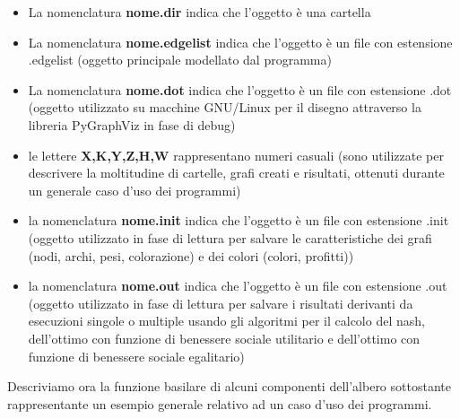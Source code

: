 \begin{itemize}
	\item La nomenclatura \textbf{nome.dir} indica che l'oggetto è una cartella
	\item La nomenclatura \textbf{nome.edgelist} indica che l'oggetto è un file con estensione .edgelist (oggetto principale modellato dal programma)
	\item La nomenclatura \textbf{nome.dot} indica che l'oggetto è un file con estensione .dot (oggetto utilizzato su macchine GNU/Linux per il disegno attraverso la libreria PyGraphViz in fase di debug)
	\item le lettere \textbf{X,K,Y,Z,H,W} rappresentano numeri casuali (sono utilizzate per descrivere la moltitudine di cartelle, grafi creati e risultati, ottenuti durante un generale caso d'uso dei programmi)
	\item la nomenclatura \textbf{nome.init} indica che l'oggetto è un file con estensione .init (oggetto utilizzato in fase di lettura per salvare le caratteristiche dei grafi (nodi, archi, pesi, colorazione) e dei colori (colori, profitti))
	\item la nomenclatura \textbf{nome.out} indica che l'oggetto è un file con estensione .out (oggetto utilizzato in fase di lettura per salvare i risultati derivanti da esecuzioni singole o multiple usando gli algoritmi per il calcolo del nash, dell'ottimo con funzione di benessere sociale utilitario e dell'ottimo con funzione di benessere sociale egalitario)
\end{itemize}

Descriviamo ora la funzione basilare di alcuni componenti dell'albero sottostante rappresentante un esempio generale relativo ad un caso d'uso dei programmi.\\

